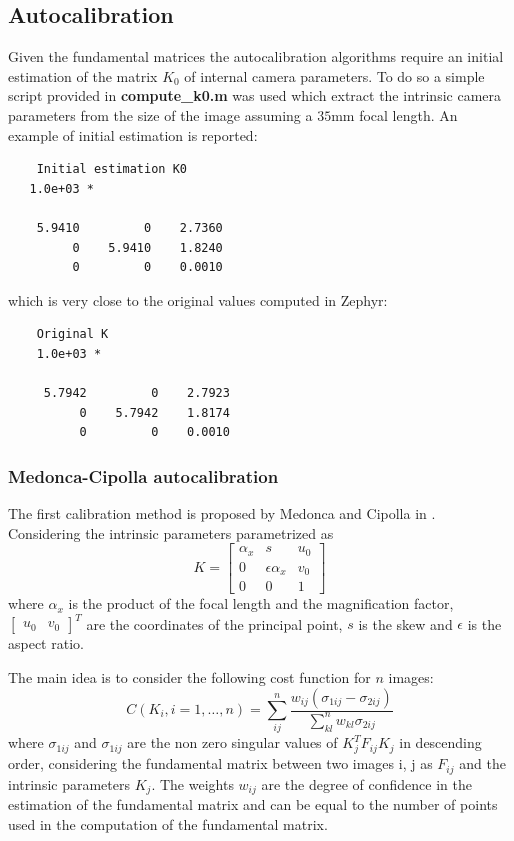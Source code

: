 \documentclass[12pt]{article}
\begin{document}
\subsection{Autocalibration}
Given the fundamental matrices the autocalibration algorithms require an initial estimation of the matrix $K_0$ of internal camera parameters. To do so a simple script provided in \textbf{compute\_k0.m} was used which extract the intrinsic camera parameters from the size of the image assuming a $35$mm focal length. An example of initial estimation is reported:
\begin{verbatim}
    Initial estimation K0
   1.0e+03 *

    5.9410         0    2.7360
         0    5.9410    1.8240
         0         0    0.0010
\end{verbatim}
which is very close to the original values computed in Zephyr:
\begin{verbatim}
    Original K
    1.0e+03 *
 
     5.7942         0    2.7923
          0    5.7942    1.8174
          0         0    0.0010
\end{verbatim}
\subsubsection{Medonca-Cipolla autocalibration}
The first calibration method is proposed by Medonca and Cipolla in \cite{Medonca99}. Considering the intrinsic parameters parametrized as
\begin{equation}
    K = \begin{bmatrix}
        \alpha_x & s & u_0 \\
        0   & \epsilon\alpha_x & v_0 \\
        0 & 0 & 1
    \end{bmatrix}
\end{equation}
where $\alpha_x$ is the product of the focal length and the magnification factor, $\begin{bmatrix}
    u_0 & v_0
\end{bmatrix}^T$ are the coordinates of the principal point, $s$ is the skew and $\epsilon$ is the aspect ratio.

The main idea is to consider the following cost function for $n$ images:
\begin{equation}
    C(K_i, i = 1,\dots, n) = \sum_{ij}^{n} \frac{w_{ij} (\sigma_{1ij}-\sigma_{2ij})}{\sum_{kl}^{n}w_{kl} \sigma_{2ij}}
\end{equation}
where $\sigma_{1ij}$ and $\sigma_{1ij}$ are the non zero singular values of $K_j^TF_{ij}K_j$ in descending order, considering the fundamental matrix between two images i, j as $F_{ij}$ and the intrinsic parameters $K_j$. The weights $w_{ij}$ are the degree of confidence in the estimation of the fundamental matrix and can be equal to the number of points used in the computation of the fundamental matrix.
\end{document}

